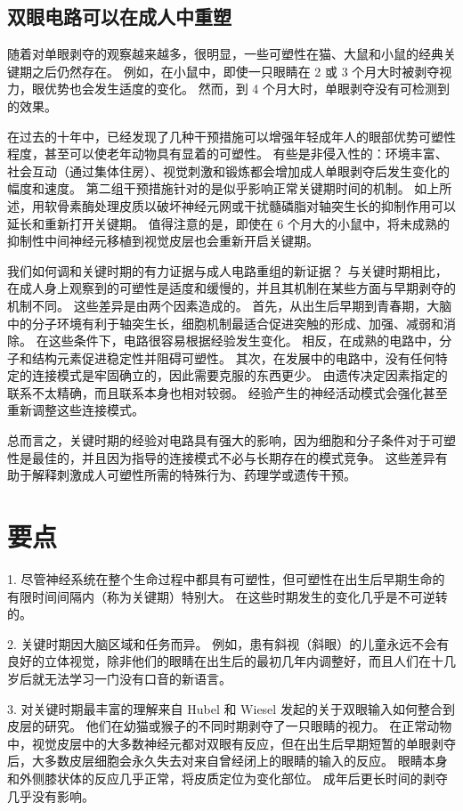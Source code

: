 \subsection{双眼电路可以在成人中重塑}
随着对单眼剥夺的观察越来越多，很明显，一些可塑性在猫、大鼠和小鼠的经典关键期之后仍然存在。 例如，在小鼠中，即使一只眼睛在 2 或 3 个月大时被剥夺视力，眼优势也会发生适度的变化。 然而，到 4 个月大时，单眼剥夺没有可检测到的效果。

在过去的十年中，已经发现了几种干预措施可以增强年轻成年人的眼部优势可塑性程度，甚至可以使老年动物具有显着的可塑性。 有些是非侵入性的：环境丰富、社会互动（通过集体住房）、视觉刺激和锻炼都会增加成人单眼剥夺后发生变化的幅度和速度。 第二组干预措施针对的是似乎影响正常关键期时间的机制。 如上所述，用软骨素酶处理皮质以破坏神经元网或干扰髓磷脂对轴突生长的抑制作用可以延长和重新打开关键期。 值得注意的是，即使在 6 个月大的小鼠中，将未成熟的抑制性中间神经元移植到视觉皮层也会重新开启关键期。

我们如何调和关键时期的有力证据与成人电路重组的新证据？ 与关键时期相比，在成人身上观察到的可塑性是适度和缓慢的，并且其机制在某些方面与早期剥夺的机制不同。 这些差异是由两个因素造成的。 首先，从出生后早期到青春期，大脑中的分子环境有利于轴突生长，细胞机制最适合促进突触的形成、加强、减弱和消除。 在这些条件下，电路很容易根据经验发生变化。 相反，在成熟的电路中，分子和结构元素促进稳定性并阻碍可塑性。 其次，在发展中的电路中，没有任何特定的连接模式是牢固确立的，因此需要克服的东西更少。 由遗传决定因素指定的联系不太精确，而且联系本身也相对较弱。 经验产生的神经活动模式会强化甚至重新调整这些连接模式。

总而言之，关键时期的经验对电路具有强大的影响，因为细胞和分子条件对于可塑性是最佳的，并且因为指导的连接模式不必与长期存在的模式竞争。 这些差异有助于解释刺激成人可塑性所需的特殊行为、药理学或遗传干预。


\section{要点}
1. 尽管神经系统在整个生命过程中都具有可塑性，但可塑性在出生后早期生命的有限时间间隔内（称为关键期）特别大。 在这些时期发生的变化几乎是不可逆转的。 

2. 关键时期因大脑区域和任务而异。 例如，患有斜视（斜眼）的儿童永远不会有良好的立体视觉，除非他们的眼睛在出生后的最初几年内调整好，而且人们在十几岁后就无法学习一门没有口音的新语言。 

3. 对关键时期最丰富的理解来自 Hubel 和 Wiesel 发起的关于双眼输入如何整合到皮层的研究。 他们在幼猫或猴子的不同时期剥夺了一只眼睛的视力。 在正常动物中，视觉皮层中的大多数神经元都对双眼有反应，但在出生后早期短暂的单眼剥夺后，大多数皮层细胞会永久失去对来自曾经闭上的眼睛的输入的反应。 眼睛本身和外侧膝状体的反应几乎正常，将皮质定位为变化部位。 成年后更长时间的剥夺几乎没有影响。 

